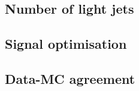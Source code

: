 \newpage
\subsection{Number of light jets}

\subsection{Signal optimisation}\label{subsec::MassCuts}

\subsection{Data-MC agreement}\label{subsec::DataMC}